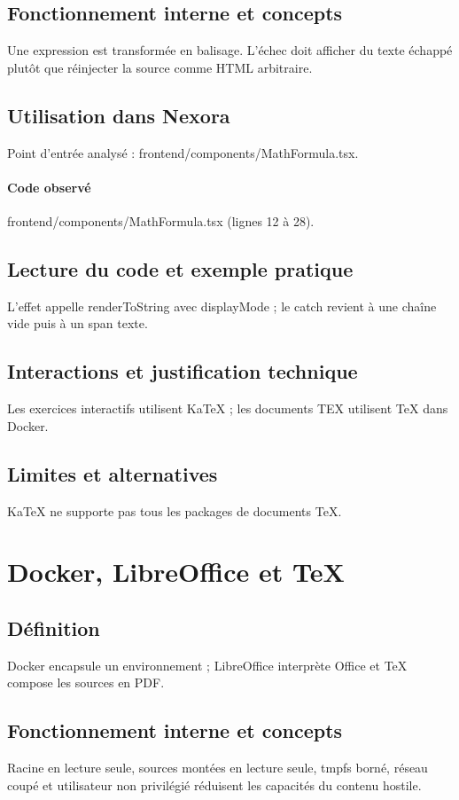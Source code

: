 \subsection*{Fonctionnement interne et concepts}
Une expression est transformée en balisage. L’échec doit afficher du texte échappé plutôt que réinjecter la source comme HTML arbitraire.

\subsection*{Utilisation dans Nexora}
Point d’entrée analysé : frontend/components/MathFormula.tsx.

\paragraph{Code observé} frontend/components/MathFormula.tsx (lignes 12 à 28).

\subsection*{Lecture du code et exemple pratique}
L’effet appelle renderToString avec displayMode ; le catch revient à une chaîne vide puis à un span texte.

\subsection*{Interactions et justification technique}
Les exercices interactifs utilisent KaTeX ; les documents TEX utilisent TeX dans Docker.

\subsection*{Limites et alternatives}
KaTeX ne supporte pas tous les packages de documents TeX.

\section{Docker, LibreOffice et TeX}
\subsection*{Définition}
Docker encapsule un environnement ; LibreOffice interprète Office et TeX compose les sources en PDF.

\subsection*{Fonctionnement interne et concepts}
Racine en lecture seule, sources montées en lecture seule, tmpfs borné, réseau coupé et utilisateur non privilégié réduisent les capacités du contenu hostile.

